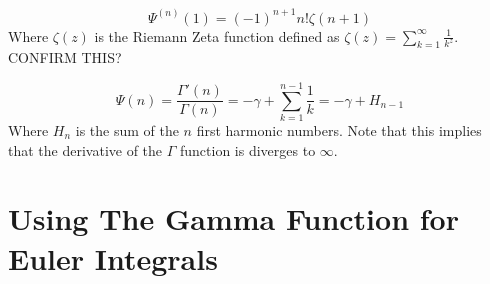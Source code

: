 \documentclass[a4paper]{article}
\begin{document}
\begin{equation}
\Psi^{(n)}(1) = (-1)^{n+1} n! \zeta(n+1)
\end{equation}
Where $\zeta(z)$ is the Riemann Zeta function defined as $\zeta(z) = \sum_{k=1}^{\infty} \frac{1}{k^z}$. CONFIRM THIS?

\begin{equation}
\Psi(n) = \frac{\Gamma'(n)}{\Gamma(n)} = -\gamma + \sum_{k=1}^{n-1} \frac{1}{k} = -\gamma + H_{n-1}
\end{equation}
Where $H_{n}$ is the sum of the $n$ first harmonic numbers. Note that this implies that the derivative of the $\Gamma$ function is diverges to $\infty$.

\section{Using The Gamma Function for Euler Integrals}
\end{document}
